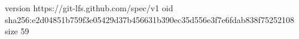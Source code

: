 version https://git-lfs.github.com/spec/v1
oid sha256:e2d04851b759f3e05429d37b456631b390ec35d556e3f7e6fdab838f75252108
size 59
